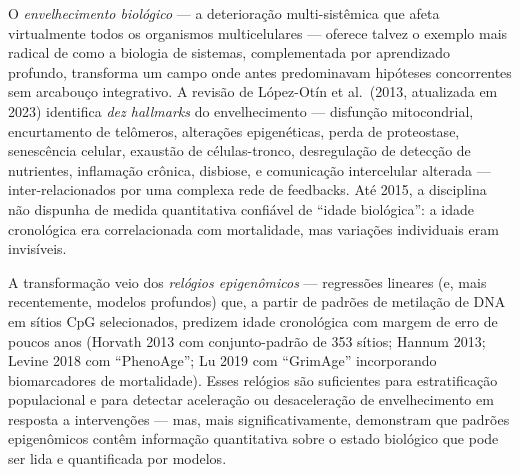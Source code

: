 


O \emph{envelhecimento biológico} --- a deterioração multi-sistêmica que afeta virtualmente todos os organismos multicelulares --- oferece talvez o exemplo mais radical de como a biologia de sistemas, complementada por aprendizado profundo, transforma um campo onde antes predominavam hipóteses concorrentes sem arcabouço integrativo. A revisão de López-Otín et al.\ (2013, atualizada em 2023) identifica \emph{dez hallmarks} do envelhecimento --- disfunção mitocondrial, encurtamento de telômeros, alterações epigenéticas, perda de proteostase, senescência celular, exaustão de células-tronco, desregulação de detecção de nutrientes, inflamação crônica, disbiose, e comunicação intercelular alterada --- inter-relacionados por uma complexa rede de feedbacks. Até 2015, a disciplina não dispunha de medida quantitativa confiável de ``idade biológica'': a idade cronológica era correlacionada com mortalidade, mas variações individuais eram invisíveis.

A transformação veio dos \emph{relógios epigenômicos} --- regressões lineares (e, mais recentemente, modelos profundos) que, a partir de padrões de metilação de DNA em sítios CpG selecionados, predizem idade cronológica com margem de erro de poucos anos (Horvath 2013 com conjunto-padrão de 353 sítios; Hannum 2013; Levine 2018 com ``PhenoAge''; Lu 2019 com ``GrimAge'' incorporando biomarcadores de mortalidade). Esses relógios são suficientes para estratificação populacional e para detectar aceleração ou desaceleração de envelhecimento em resposta a intervenções --- mas, mais significativamente, demonstram que padrões epigenômicos contêm informação quantitativa sobre o estado biológico que pode ser lida e quantificada por modelos.



